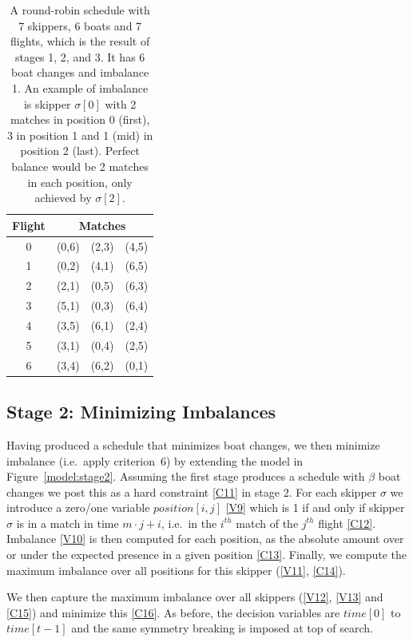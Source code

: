 \documentclass{llncs}
\newcommand{\timeVar}{\mathit{time}}
\begin{document}
{\begin{table}
    \setlength{\tabcolsep}{3pt}
    \begin{tabular}{cccc}
        \toprule
        Flight & \multicolumn{3}{c}{Matches} \\ \midrule
        0 & (0,6) & (2,3) & (4,5) \\
        1 & (0,2) & (4,1) & (6,5) \\
        2 & (2,1) & (0,5) & (6,3) \\
        3 & (5,1) & (0,3) & (6,4) \\
        4 & (3,5) & (6,1) & (2,4) \\
        5 & (3,1) & (0,4) & (2,5) \\
        6 & (3,4) & (6,2) & (0,1) \\ \bottomrule
    \end{tabular}
    \caption{A round-robin schedule with 7 skippers, 6 boats and 7 flights, which is the result of
        stages 1, 2, and 3. It has 6 boat changes and imbalance 1. An example of imbalance is
        skipper $\sigma[{0}]$ with 2 matches in position 0 (first), 3 in position 1 and 1 (mid) in
        position 2 (last). Perfect balance would be 2 matches in each position, only achieved by
        $\sigma[{2}]$.}\label{tab2}
\end{table}
\clearpage %
}

\subsection{Stage 2: Minimizing Imbalances}
Having produced a schedule that minimizes boat changes, we then minimize imbalance (i.e.\ apply
criterion~6) by extending the model in Figure~\ref{model:stage2}.  Assuming the first stage
produces a schedule with $\beta$ boat changes we post this as a hard constraint \eqref{C11} in stage
2. For each skipper $\sigma$ we introduce a zero/one variable $position[{i,j}]$ \eqref{V9} which is
1 if and only if skipper $\sigma$ is in a match in time $m \cdot j + i$, i.e.\ in the $i^{th}$ match
of the  $j^{th}$ flight \eqref{C12}. Imbalance \eqref{V10} is then computed for each position, as
the absolute amount over or under the expected presence in a given position \eqref{C13}. Finally, we
compute the maximum imbalance over all positions for this skipper (\ref{V11}, \ref{C14}).

We then capture the maximum imbalance over all skippers (\ref{V12}, \ref{V13} and \ref{C15}) and
minimize this \eqref{C16}. As before, the decision variables are $\timeVar[{0}]$ to
$\timeVar[{t-1}]$ and the same symmetry breaking is imposed at top of search.
\end{document}
